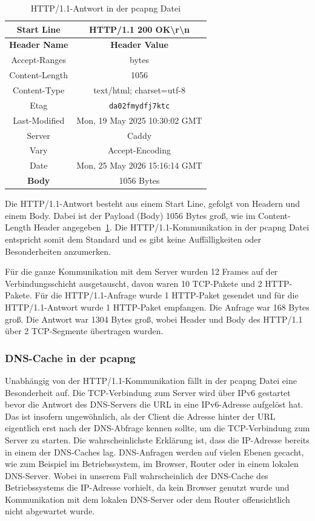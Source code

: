 \begin{table}[h]
    \centering
    \begin{tabular}{|c|c|}
        \hline
        \textbf{Start Line} & HTTP/1.1 200 OK\textbackslash{}r\textbackslash{}n \\
        \hline
        \textbf{Header Name} & \textbf{Header Value} \\
        \hline
        Accept-Ranges & bytes \\
        Content-Length & 1056 \\
        Content-Type & text/html; charset=utf-8 \\
        Etag & \texttt{da02fmydfj7ktc} \\
        Last-Modified & Mon, 19 May 2025 10:30:02 GMT \\
        Server & Caddy \\
        Vary & Accept-Encoding \\
        Date & Mon, 25 May 2026 15:16:14 GMT \\
        \hline
        \textbf{Body} & 1056 Bytes \\
        \hline
    \end{tabular}
    \caption{HTTP/1.1-Antwort in der pcapng Datei}\label{tab:http11-header-response}
\end{table}

Die HTTP/1.1-Antwort besteht aus einem Start Line, gefolgt von Headern und einem Body. Dabei ist der Payload (Body) 1056 Bytes groß, wie im Content-Length Header angegeben~\ref{tab:http11-header-response}.
Die HTTP/1.1-Kommunikation in der pcapng Datei entspricht somit dem Standard und es gibt keine Auffälligkeiten oder Besonderheiten anzumerken.

Für die ganze Kommunikation mit dem Server wurden 12 Frames auf der Verbindungsschicht ausgetauscht, davon waren 10 TCP-Pakete und 2 HTTP-Pakete.
Für die HTTP/1.1-Anfrage wurde 1 HTTP-Paket gesendet und für die HTTP/1.1-Antwort wurde 1 HTTP-Paket empfangen.
Die Anfrage war 168 Bytes groß.
Die Antwort war 1304 Bytes groß, wobei Header und Body des HTTP/1.1 über 2 TCP-Segmente übertragen wurden.

\subsubsection*{DNS-Cache in der pcapng}
Unabhängig von der HTTP/1.1-Kommunikation fällt in der pcapng Datei eine Besonderheit auf.
Die TCP-Verbindung zum Server wird über IPv6 gestartet bevor die Antwort des DNS-Servers die URL in eine IPv6-Adresse aufgelöst hat.
Das ist insofern ungewöhnlich, als der Client die Adresse hinter der URL eigentlich erst nach der DNS-Abfrage kennen sollte, um die TCP-Verbindung zum Server zu starten.
Die wahrscheinlichste Erklärung ist, dass die IP-Adresse bereits in einem der DNS-Caches lag.
DNS-Anfragen werden auf vielen Ebenen gecacht, wie zum Beispiel im Betriebssystem, im Browser, Router oder in einem lokalen DNS-Server.
Wobei in unserem Fall wahrscheinlich der DNS-Cache des Betriebssystems die IP-Adresse vorhielt, da kein Browser genutzt wurde und Kommunikation mit dem lokalen DNS-Server oder dem Router offensichtlich nicht abgewartet wurde.
